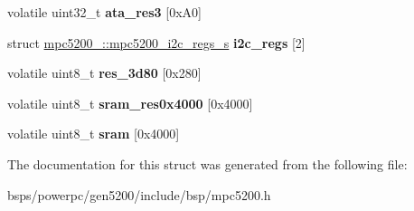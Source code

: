 \begin{DoxyCompactItemize}
\mbox{\label{structmpc5200___a370dc9359f82798e2af6ff3bbf3968ae}} 
volatile uint32\+\_\+t {\bfseries ata\+\_\+res3} \mbox{[}0x\+A0\mbox{]}
\item 
\mbox{\label{structmpc5200___ad0916a3c5f77a31dda584f16a3989de9}} 
struct \mbox{\hyperlink{structmpc5200___1_1mpc5200__i2c__regs__s}{mpc5200\+\_\+\+::mpc5200\+\_\+i2c\+\_\+regs\+\_\+s}} {\bfseries i2c\+\_\+regs} \mbox{[}2\mbox{]}
\item 
\mbox{\label{structmpc5200___a25b8d5e815a112a60c885bb3a23091ae}} 
volatile uint8\+\_\+t {\bfseries res\+\_\+3d80} \mbox{[}0x280\mbox{]}
\item 
\mbox{\label{structmpc5200___ac866d63104538765f00407a347327943}} 
volatile uint8\+\_\+t {\bfseries sram\+\_\+res0x4000} \mbox{[}0x4000\mbox{]}
\item 
\mbox{\label{structmpc5200___accd2a21296b7dbf70b35581c765e2751}} 
volatile uint8\+\_\+t {\bfseries sram} \mbox{[}0x4000\mbox{]}
\end{DoxyCompactItemize}


The documentation for this struct was generated from the following file\+:\begin{DoxyCompactItemize}
\item 
bsps/powerpc/gen5200/include/bsp/mpc5200.\+h\end{DoxyCompactItemize}
